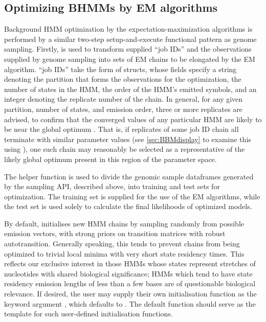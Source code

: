 \documentclass{ut-thesis}
\begin{document}
\begin{NoHyper}
\section{Optimizing BHMMs by EM algorithms}
Background HMM optimization by the expectation-maximization algorithms is performed by a similar two-step setup-and-execute functional pattern as genome sampling. Firstly,  is used to transform supplied ``job IDs'' and the observations supplied by genome sampling into sets of EM chains to be elongated by the EM algorithm.  ``job IDs'' take the form of  structs, whose fields specify a string denoting the partition that forms the observations for the optimization, the number of states in the HMM, the order of the HMM's emitted symbols, and an integer denoting the replicate number of the chain. In general, for any given partition, number of states, and emission order, three or more replicates are advised, to confirm that the converged values of any particular HMM are likely to be near the global optimum \cite{Yang2015b}. That is, if replicates of some job ID chain all terminate with similar parameter values (see \autoref{sec:BBMdisplay} to examine this using ), one such chain may reasonably be selected as a representative of the likely global optimum present in this region of the parameter space.

The helper function  is used to divide the genomic sample dataframes generated by the sampling API, described above, into training and test sets for optimization. The training set is supplied for the use of the EM algorithms, while the test set is used solely to calculate the final likelihoods of optimized models.

By default,  initialises new HMM chains by sampling randomly from possible emission vectors, with strong priors on transition matrices with robust autotransition. Generally speaking, this tends to prevent chains from being optimized to trivial local minima with very short state residency times. This reflects our exclusive interest in those HMMs whose states represent stretches of nucleotides with shared biological significance; HMMs which tend to have state residency emission lengths of less than a few bases are of questionable biological relevance. If desired, the user may supply their own initialisation function as the  keyword argument , which defaults to . The default function should serve as the template for such user-defined initialisation functions.


\end{NoHyper}
\end{document}
